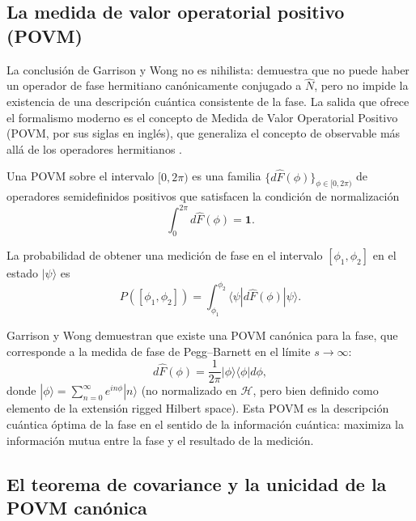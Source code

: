         \subsection{La medida de valor operatorial positivo (POVM)}
        
            La conclusión de Garrison y Wong no es nihilista: demuestra que no puede haber un operador de fase hermitiano canónicamente conjugado a $\hat{N}$, pero no impide la existencia de una descripción cuántica consistente de la fase. La salida que ofrece el formalismo moderno es el concepto de Medida de Valor Operatorial Positivo (POVM, por sus siglas en inglés), que generaliza el concepto de observable más allá de los operadores hermitianos \cite{Helstrom1976,Holevo1982}.
            
            Una POVM sobre el intervalo $[0, 2\pi)$ es una familia $\{d\hat{F}(\phi)\}_{\phi \in [0,2\pi)}$ de operadores semidefinidos positivos que satisfacen la condición de normalización
            \begin{equation}
                \int_0^{2\pi} d\hat{F}(\phi) = \mathbf{1}.
                \label{eq:POVM_normalizacion}
            \end{equation}
            
            La probabilidad de obtener una medición de fase en el intervalo $[\phi_1, \phi_2]$ en el estado $|\psi\rangle$ es
            \begin{equation}
                P([\phi_1, \phi_2]) = \int_{\phi_1}^{\phi_2} \langle\psi|d\hat{F}(\phi)|\psi\rangle.
                \label{eq:POVM_probabilidad}
            \end{equation}
            
            Garrison y Wong demuestran que existe una POVM canónica para la fase, que corresponde a la medida de fase de Pegg--Barnett en el límite $s \to \infty$:
            \begin{equation}
                d\hat{F}(\phi) = \frac{1}{2\pi}\left|\phi\rangle\langle\phi\right| d\phi,
            \end{equation}
            donde $|\phi\rangle = \sum_{n=0}^{\infty} e^{in\phi}|n\rangle$ (no normalizado en $\mathcal{H}$, pero bien definido como elemento de la extensión rigged Hilbert space). Esta POVM es la descripción cuántica óptima de la fase en el sentido de la información cuántica: maximiza la información mutua entre la fase y el resultado de la medición.
        
        \subsection{El teorema de covariance y la unicidad de la POVM canónica}
        
